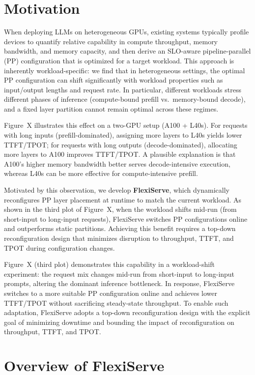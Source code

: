 \documentclass[sigplan,screen]{acmart}
\begin{document}
\section{Motivation}
When deploying LLMs on heterogeneous GPUs, existing systems typically profile devices to quantify relative capability in compute throughput, memory bandwidth, and memory capacity, and then derive an SLO-aware pipeline-parallel (PP) configuration that is optimized for a target workload. This approach is inherently workload-specific: we find that in heterogeneous settings, the optimal PP configuration can shift significantly with workload properties such as input/output lengths and request rate. In particular, different workloads stress different phases of inference (compute-bound prefill vs.\ memory-bound decode), and a fixed layer partition cannot remain optimal across these regimes.

Figure~X illustrates this effect on a two-GPU setup (A100 + L40s). For requests with long inputs (prefill-dominated), assigning more layers to L40s yields lower TTFT/TPOT; for requests with long outputs (decode-dominated), allocating more layers to A100 improves TTFT/TPOT. A plausible explanation is that A100's higher memory bandwidth better serves decode-intensive execution, whereas L40s can be more effective for compute-intensive prefill. 

Motivated by this observation, we develop \textbf{FlexiServe}, which dynamically reconfigures PP layer placement at runtime to match the current workload. As shown in the third plot of Figure~X, when the workload shifts mid-run (from short-input to long-input requests), FlexiServe switches PP configurations online and outperforms static partitions. Achieving this benefit requires a top-down reconfiguration design that minimizes disruption to throughput, TTFT, and TPOT during configuration changes.


Figure~X (third plot) demonstrates this capability in a workload-shift experiment: the request mix changes mid-run from short-input to long-input prompts, altering the dominant inference bottleneck. In response, FlexiServe switches to a more suitable PP configuration online and achieves lower TTFT/TPOT without sacrificing steady-state throughput. To enable such adaptation, FlexiServe adopts a top-down reconfiguration design with the explicit goal of minimizing downtime and bounding the impact of reconfiguration on throughput, TTFT, and TPOT.

\section{Overview of FlexiServe}
\end{document}
